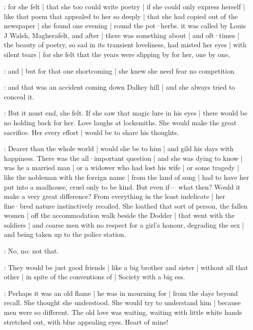 \gertyRomantic:
for she felt |
that she too could write poetry |
if she could only express herself |
like that poem that appealed to her so deeply |
that she had copied out of the newspaper |
she found one evening |
round the pot·herbs.
it was called by Louis J Walsh,
Magherafelt,
and after |
there was something about
 |
and oft·times |
the beauty of poetry,
so sad in its transient loveliness,
had misted her eyes |
with silent tears |
for she felt
that the years were slipping by for her,
one by one,

\gertyNovel:
and |
but for that one shortcoming |%
she knew she need fear no competition

\gertyReal:
and that was an accident coming down Dalkey hill |
and she always tried to conceal it.

\gertyNovel:
But it must end,
she felt.
If she saw that magic lure in his eyes |
there would be no holding back for her.
Love laughs at locksmiths.
She would make the great sacrifice.
Her every effort |
would be to share his thoughts.

\gertyRomantic:
Dearer than the whole world |
would she be to him |
and gild his days with happiness.
There was the all·important question |
and she was dying to know |
was he a married man |
or a widower who had lost his wife |
or some tragedy |
like the nobleman with the foreign name |
from the land of song |
had to have her put into a madhouse,
cruel only to be kind.
But even if—%
what then?
Would it make a very great difference?%
From everything in the least indelicate |
her fine·bred nature instinctively recoiled.
She loathed that sort of person,
the fallen women |
off the accommodation walk beside the Dodder |
that went with the soldiers |
and coarse men
with no respect for a girl's honour,
degrading the sex |
and being taken up to the police station.

\gertyJudgy:
No,
no:
not that.

\gertyRomantic:
They would be just good friends |
like a big brother and sister |
without all that other |
in spite of the conventions of |
Society with a big ess.

\gertyNovel:
Perhaps it was an old flame |
he was in mourning for |
from the days beyond recall.
She thought she understood.
She would try to understand him |
because men were so different.
The old love was waiting,
waiting with little white hands stretched out,
with blue appealing eyes.%
Heart of mine!

